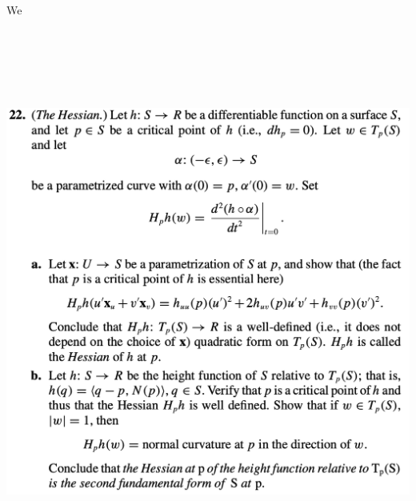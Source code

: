 \documentclass{report}
\begin{document}
We 




\begin{question}{}{}
\includegraphics[height=18cm,width=18cm]{hw5q11}
\end{question}
\end{document}
